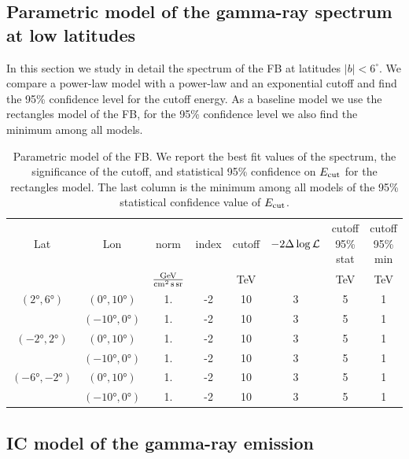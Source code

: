 \subsection{Parametric model of the gamma-ray spectrum at low latitudes}
\label{sec:param_model}

In this section we study in detail the spectrum of the FB at latitudes $|b| < 6^\circ$.
We compare a power-law model with a power-law and an exponential cutoff and find 
the 95\% confidence level for the cutoff energy.
As a baseline model we use the rectangles model of the FB, for the 95\% confidence level 
we also find the minimum among all models.

\begin{table}
  \begin{center}
    \caption{Parametric model of the FB. We report the best fit values of the spectrum, the significance of the cutoff, 
    and statistical 95\% confidence on $E_{\rm cut}$ for the rectangles model.
    The last column is the minimum among all models of the 95\% statistical confidence value of $E_{\rm cut}$.}
    \label{tab:param}
    \begin{tabular}{|c|c|c|c|c|c|c|c|} %
     	\hline
		 Lat & Lon  & norm & index & cutoff &  $-2 \Delta \log {\mathcal{L}}$ & cutoff 95\% stat & cutoff 95\% min \\ 
		       &        &  ${\rm \frac{GeV}{cm^{2}\, s\, sr}}$ &  & {\rm TeV} & & {\rm TeV} & {\rm TeV} \\ 
		\hline
  		$(\ang{2}, \ang{6})$ & $(\ang{0}, \ang{10})$ & 1.  & -2 & 10 & 3 & 5 & 1 \\ 
		& $(\ang{-10}, \ang{0})$ & 1.  & -2 & 10 & 3 & 5 & 1  \\ 
 		\hline
  		$(\ang{-2}, \ang{2})$ & $(\ang{0}, \ang{10})$  & 1.  & -2 & 10 & 3 & 5 & 1  \\ 
		& $(\ang{-10}, \ang{0})$  & 1.  & -2 & 10 & 3 & 5 & 1   \\ 
 		\hline
  		$(\ang{-6}, \ang{-2})$ & $(\ang{0}, \ang{10})$  & 1.  & -2 & 10 & 3 & 5 & 1  \\ 
		& $(\ang{-10}, \ang{0})$ & 1.  & -2 & 10 & 3 & 5 & 1 \\ 
 \hline
    \end{tabular}
  \end{center}
\end{table}




\subsection{IC model of the gamma-ray emission}
\label{sec:IC_model}

